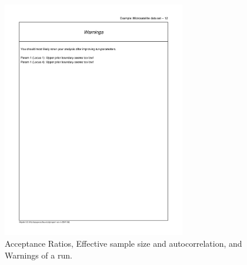 \begin{figure}[bh]
\begin{center}
\includegraphics[width=8cm]{mim/warnings}
\end{center}
\caption{Acceptance Ratios, Effective sample size and autocorrelation, and Warnings of a run.
\label{ESS}}
\end{figure}

\newpage
